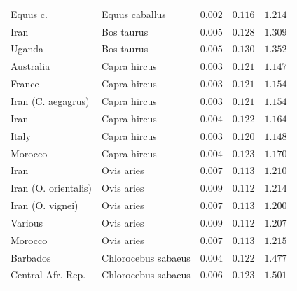 \documentclass{article}
\begin{document}
\begin{center}
\begin{longtable*}{|l|l|r|r|r|}
            \bottomrule
            \endlastfoot
            Equus c. &      Equus caballus &               $ 0.002$ &                $ 0.116$ &              $ 1.214$ \\
            Iran &          Bos taurus &               $ 0.005$ &                $ 0.128$ &              $ 1.309$ \\
            Uganda &          Bos taurus &               $ 0.005$ &                $ 0.130$ &              $ 1.352$ \\
            Australia &        Capra hircus &               $ 0.003$ &                $ 0.121$ &              $ 1.147$ \\
            France &        Capra hircus &               $ 0.003$ &                $ 0.121$ &              $ 1.154$ \\
            Iran (C. aegagrus) &        Capra hircus &               $ 0.003$ &                $ 0.121$ &              $ 1.154$ \\
            Iran &        Capra hircus &               $ 0.004$ &                $ 0.122$ &              $ 1.164$ \\
            Italy &        Capra hircus &               $ 0.003$ &                $ 0.120$ &              $ 1.148$ \\
            Morocco &        Capra hircus &               $ 0.004$ &                $ 0.123$ &              $ 1.170$ \\
            Iran &          Ovis aries &               $ 0.007$ &                $ 0.113$ &              $ 1.210$ \\
            Iran (O. orientalis) &          Ovis aries &               $ 0.009$ &                $ 0.112$ &              $ 1.214$ \\
            Iran (O. vignei) &          Ovis aries &               $ 0.007$ &                $ 0.113$ &              $ 1.200$ \\
            Various &          Ovis aries &               $ 0.009$ &                $ 0.112$ &              $ 1.207$ \\
            Morocco &          Ovis aries &               $ 0.007$ &                $ 0.113$ &              $ 1.215$ \\
            Barbados & Chlorocebus sabaeus &               $ 0.004$ &                $ 0.122$ &              $ 1.477$ \\
            Central Afr. Rep. & Chlorocebus sabaeus &               $ 0.006$ &                $ 0.123$ &              $ 1.501$ \\

\end{longtable*}
\end{center}
\end{document}
